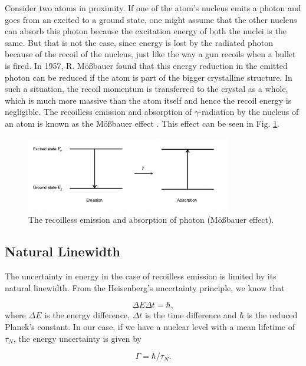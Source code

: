\documentclass[a4paper]{report}
\numberwithin{equation}{section}
\begin{document}
Consider two atoms in proximity. If one of the atom's nucleus emits a photon and goes from an excited to a ground state, one might assume that the other nucleus can absorb this photon because the excitation energy of both the nuclei is the same. But that is not the case, since energy is lost by the radiated photon because of the recoil of the nucleus, just like the way a gun recoils when a bullet is fired. In 1957, R. M\"o{\ss}bauer found that this energy reduction in the emitted photon can be reduced if the atom is part of the bigger crystalline structure. In such a situation, the recoil momentum is transferred to the crystal as a whole, which is much more massive than the atom itself and hence the recoil energy is negligible. The recoilless emission and absorption of $\gamma $-radiation by the nucleus of an atom is known as the M\"o{\ss}bauer effect \cite{Schatz1996}. This effect can be seen in Fig. \ref{fig:moess}.

\begin{figure}[htpb]
    \centering
    \includegraphics[width=0.8\textwidth]{moessbauer-effect}
    \caption{The recoilless emission and absorption of photon (M\"o{\ss}bauer effect).}
    \label{fig:moess}
\end{figure}

\subsection{Natural Linewidth}
The uncertainty in energy in the case of recoilless emission is limited by its natural linewidth. From the Heisenberg's uncertainty principle, we know that 

\begin{equation}
		\Delta E \Delta t = \hbar,
\end{equation}
where $\Delta E $ is the energy difference, $\Delta t$ is the time difference and $\hbar $ is the reduced Planck's constant. In our case, if we have a nuclear level with a mean lifetime of $\tau _{N}$, the energy uncertainty is given by

\begin{equation} \label{eqn:uncertainty}
		\Gamma = \hbar / \tau _{N}.	
\end{equation}
\end{document}
